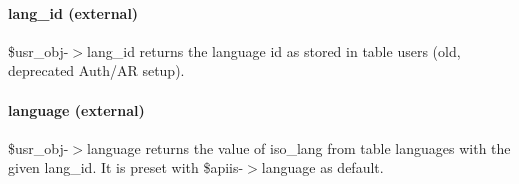 \paragraph*{lang\_id (external)\label{Apiis::DataBase::User_--_collecting_and_providing_user_data_lang_id_external_}}


\$usr\_obj-$>$lang\_id returns the language id as stored in table users (old,
deprecated Auth/AR setup).

\paragraph*{language (external)\label{Apiis::DataBase::User_--_collecting_and_providing_user_data_language_external_}}


\$usr\_obj-$>$language returns the value of iso\_lang from table languages with
the given lang\_id. It is preset with \$apiis-$>$language as default.

